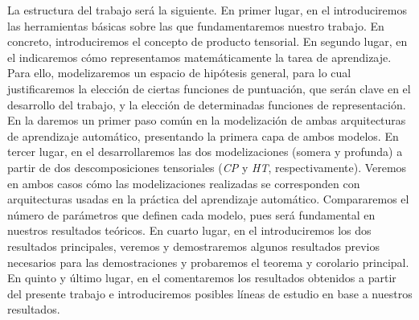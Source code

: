 La estructura del trabajo será la siguiente. En primer lugar, en el  introduciremos las herramientas básicas sobre las que fundamentaremos nuestro trabajo. En concreto, introduciremos el concepto de producto tensorial. En segundo lugar, en el  indicaremos cómo representamos matemáticamente la tarea de aprendizaje. Para ello, modelizaremos un espacio de hipótesis general, para lo cual justificaremos la elección de ciertas funciones de puntuación, que serán clave en el desarrollo del trabajo, y la elección de determinadas funciones de representación. En la  daremos un primer paso común en la modelización de ambas arquitecturas de aprendizaje automático, presentando la primera capa de ambos modelos. En tercer lugar, en el  desarrollaremos las dos modelizaciones (somera y profunda) a partir de dos descomposiciones tensoriales (\textit{CP} y \textit{HT}, respectivamente). Veremos en ambos casos cómo las modelizaciones realizadas se corresponden con arquitecturas usadas en la práctica del aprendizaje automático. Compararemos el número de parámetros que definen cada modelo, pues será fundamental en nuestros resultados teóricos. En cuarto lugar, en el  introduciremos los dos resultados principales, veremos y demostraremos algunos resultados previos necesarios para las demostraciones y probaremos el teorema y corolario principal. En quinto y último lugar, en el  comentaremos los resultados obtenidos a partir del presente trabajo e introduciremos posibles líneas de estudio en base a nuestros resultados.

